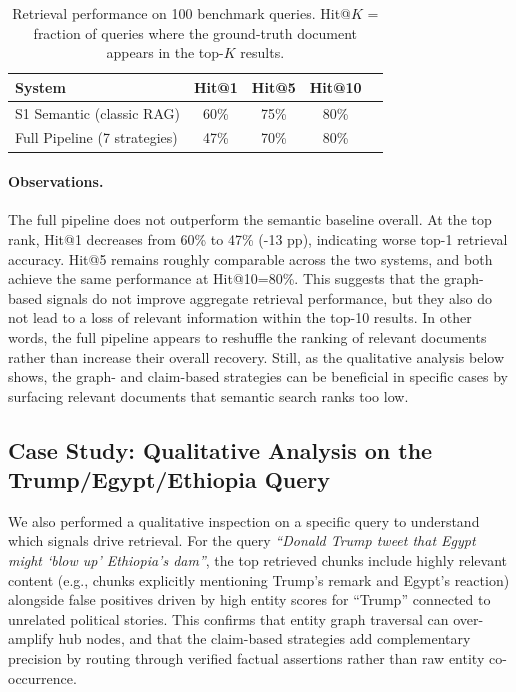 \documentclass[10pt]{article}
\begin{document}
\begin{table}[H]
\centering
\begin{tabular}{lcccc}
\toprule
\textbf{System} & \textbf{Hit@1} & \textbf{Hit@5} & \textbf{Hit@10}  \\
\midrule
S1 Semantic (classic RAG) & 60\% & 75\% & 80\% \\
Full Pipeline (7 strategies) & 47\% & 70\% & 80\% \\
\bottomrule
\end{tabular}
\caption{Retrieval performance on 100 benchmark queries. Hit@$K$ = fraction of queries where the ground-truth document appears in the top-$K$ results.}
\label{tab:results}
\end{table}

\paragraph{Observations.} The full pipeline does not outperform the semantic baseline overall. At the top rank, Hit@1 decreases from 60\% to 47\% (-13 pp), indicating worse top-1 retrieval accuracy. Hit@5 remains roughly comparable across the two systems, and both achieve the same performance at Hit@10=80\%. This suggests that the graph-based signals do not improve aggregate retrieval performance, but they also do not lead to a loss of relevant information within the top-10 results. In other words, the full pipeline appears to reshuffle the ranking of relevant documents rather than increase their overall recovery. Still, as the qualitative analysis below shows, the graph- and claim-based strategies can be beneficial in specific cases by surfacing relevant documents that semantic search ranks too low.

\subsection{Case Study: Qualitative Analysis on the Trump/Egypt/Ethiopia Query}

We also performed a qualitative inspection on a specific query to understand which signals drive retrieval. For the query \emph{``Donald Trump tweet that Egypt might `blow up' Ethiopia's dam''}, the top retrieved chunks include highly relevant content (e.g., chunks explicitly mentioning Trump's remark and Egypt's reaction) alongside false positives driven by high entity scores for ``Trump'' connected to unrelated political stories. This confirms that entity graph traversal can over-amplify hub nodes, and that the claim-based strategies add complementary precision by routing through verified factual assertions rather than raw entity co-occurrence.
\end{document}
